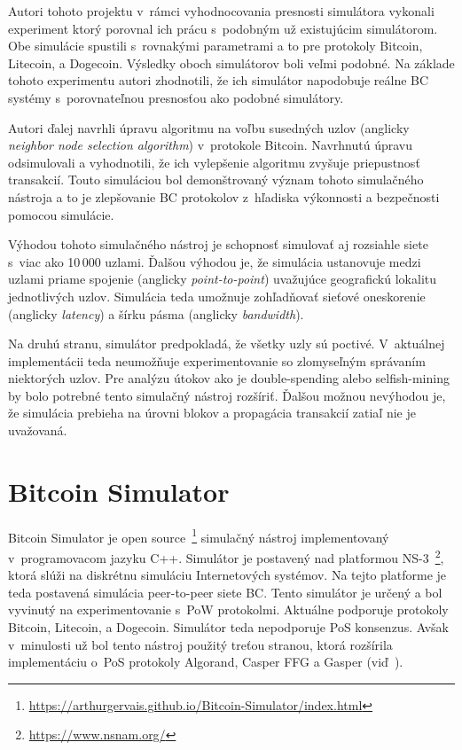 Autori tohoto projektu v~rámci vyhodnocovania presnosti simulátora vykonali experiment ktorý porovnal ich prácu s~podobným už existujúcim simulátorom. Obe simulácie spustili s~rovnakými parametrami a to pre protokoly Bitcoin, Litecoin, a Dogecoin. Výsledky oboch simulátorov boli veľmi podobné. Na základe tohoto experimentu autori zhodnotili, že ich simulátor napodobuje reálne BC systémy s~porovnateľnou presnosťou ako podobné simulátory.

Autori ďalej navrhli úpravu algoritmu na voľbu susedných uzlov (anglicky \textit{neighbor node selection algorithm}) v~protokole Bitcoin. Navrhnutú úpravu odsimulovali a vyhodnotili, že ich vylepšenie algoritmu zvyšuje priepustnosť transakcií. Touto simuláciou bol demonštrovaný význam tohoto simulačného nástroja a to je zlepšovanie BC protokolov z~hľadiska výkonnosti a bezpečnosti pomocou simulácie.~\cite{simblockWp}

Výhodou tohoto simulačného nástroj je schopnosť simulovať aj rozsiahle siete s~viac ako 10\,000 uzlami. Ďalšou výhodou je, že simulácia ustanovuje medzi uzlami priame spojenie (anglicky \textit{point-to-point}) uvažujúce geografickú lokalitu jednotlivých uzlov. Simulácia teda umožnuje zohľadňovať sieťové oneskorenie (anglicky \textit{latency}) a šírku pásma (anglicky \textit{bandwidth}). 

Na druhú stranu, simulátor predpokladá, že všetky uzly sú poctivé. V~aktuálnej implementácii teda neumožňuje experimentovanie so zlomyseľným správaním niektorých uzlov. Pre analýzu útokov ako je double-spending alebo selfish-mining by bolo potrebné tento simulačný nástroj rozšíriť. Ďalšou možnou nevýhodou je, že simulácia prebieha na úrovni blokov a propagácia transakcií zatiaľ nie je uvažovaná.~\cite{fanPerfEval}

\section{Bitcoin Simulator}

Bitcoin Simulator je open source~\footnote{\url{https://arthurgervais.github.io/Bitcoin-Simulator/index.html}} simulačný nástroj implementovaný v~programovacom jazyku C++. Simulátor je postavený nad platformou NS-3~\footnote{\url{https://www.nsnam.org/}}, ktorá slúži na diskrétnu simuláciu Internetových systémov. Na tejto platforme je teda postavená simulácia peer-to-peer siete BC. Tento simulátor je určený a bol vyvinutý na experimentovanie s~PoW protokolmi. Aktuálne podporuje protokoly Bitcoin, Litecoin, a Dogecoin. Simulátor teda nepodporuje PoS konsenzus. Avšak v~minulosti už bol tento nástroj použitý treťou stranou, ktorá rozšírila implementáciu o~PoS protokoly Algorand, Casper FFG a Gasper (viď~\cite{borcikDp}). 


